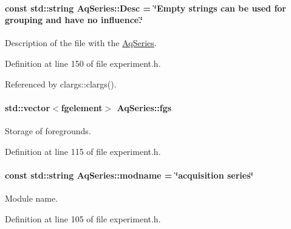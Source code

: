 \hypertarget{classAqSeries_ad5432c721e2811d0c8171401e8d0c9aa}{
\paragraph[{Desc}]{\setlength{\rightskip}{0pt plus 5cm}const std::string {\bf AqSeries::Desc} = \char`\"{}Empty strings can be used for grouping and have no influence.\char`\"{}}\hfill}
\label{classAqSeries_ad5432c721e2811d0c8171401e8d0c9aa}


Description of the file with the \hyperlink{classAqSeries}{AqSeries}. 



Definition at line 150 of file experiment.h.



Referenced by clargs::clargs().

\hypertarget{classAqSeries_a3b74470679bea53979f09deaa8811514}{
\paragraph[{fgs}]{\setlength{\rightskip}{0pt plus 5cm}std::vector$<${\bf fgelement}$>$ {\bf AqSeries::fgs}}\hfill}
\label{classAqSeries_a3b74470679bea53979f09deaa8811514}


Storage of foregrounds. 



Definition at line 115 of file experiment.h.

\hypertarget{classAqSeries_a0b757fedd7bbbd264e301ee4e8d96b7d}{
\paragraph[{modname}]{\setlength{\rightskip}{0pt plus 5cm}const std::string {\bf AqSeries::modname} = \char`\"{}acquisition series\char`\"{}}\hfill}
\label{classAqSeries_a0b757fedd7bbbd264e301ee4e8d96b7d}


Module name. 



Definition at line 105 of file experiment.h.


